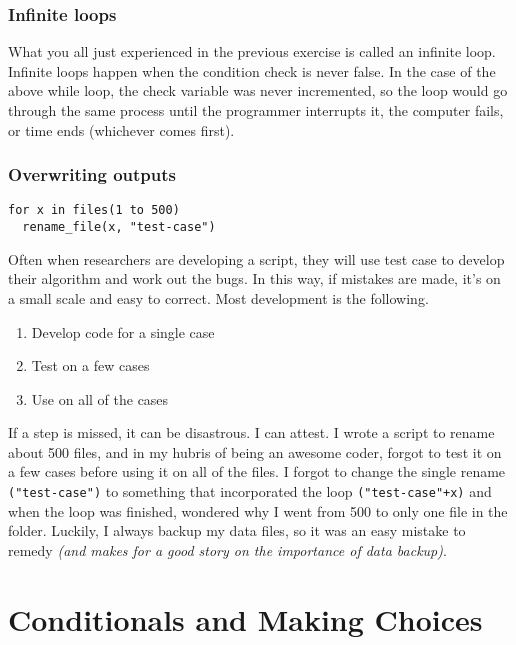 \documentclass[
]{book}
\providecommand{\tightlist}{%
  \setlength{\itemsep}{0pt}\setlength{\parskip}{0pt}}
\begin{document}
\subsection{Infinite loops}\label{infinite-loops}

What you all just experienced in the previous exercise is called an infinite loop. Infinite loops happen when the condition check is never false. In the case
of the above while loop, the check variable was never incremented, so the loop would go through the same process until the programmer interrupts it, the computer fails, or time ends (whichever comes first).

\subsection{Overwriting outputs}\label{overwriting-outputs}

\begin{verbatim}
for x in files(1 to 500) 
  rename_file(x, "test-case")
\end{verbatim}

Often when researchers are developing a script, they will use test case to develop their algorithm and work out the bugs. In this way, if mistakes are made, it's on a small scale and easy to correct. Most development is the following.

\begin{enumerate}
\def\labelenumi{\arabic{enumi}.}
\tightlist
\item
  Develop code for a single case
\item
  Test on a few cases
\item
  Use on all of the cases
\end{enumerate}

If a step is missed, it can be disastrous. I can attest. I wrote a script to rename about 500 files, and in my hubris of being an awesome coder, forgot to test it on a few cases before using it on all of the files. I forgot to change the single rename \texttt{("test-case")} to something that incorporated the loop \texttt{("test-case"+x)} and when the loop was finished, wondered why I went from 500 to only one file in the folder. Luckily, I always backup my data files, so it was an easy mistake to remedy \emph{(and makes for a good story on the importance of data backup)}.

\chapter{Conditionals and Making Choices}\label{conditionals-and-making-choices}
\end{document}
